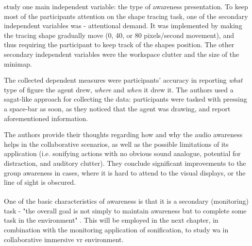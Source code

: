 \parencite{gutwin_chalk_2011} study one main independent variable: the type of awareness presentation. To keep most of the participants attention on the shape tracing task, one of the secondary independent variables was - attentional demand. It was implemented by making the tracing shape gradually move (0, 40, or 80 pixels/second movement), and thus requiring the participant to keep track of the shapes position. The other secondary independent variables were the workspace clutter and the size of the minimap.

The collected dependent measures were participants' accuracy in reporting \textit{what }type of figure the agent drew, \textit{where }and \textit{when }it drew it.
The authors used a \gls{sagat}-like approach for collecting the data: participants were tasked with pressing a space-bar as soon, as they noticed that the agent was drawing, and report aforementioned information.

The authors provide their thoughts regarding how and why the audio awareness helps in the collaborative scenarios, as well as the possible limitations of its application (i.e. sonifying actions with no obvious sound analogue, potential for distraction, and auditory clutter). They conclude significant improvements to the group awareness in cases, where it is hard to attend to the visual displays, or the line of sight is obscured.


\paragraph[Bridge to experiments]{}
One of the basic characteristics of awareness is that it is a secondary (monitoring) task - "the overall goal is not simply to maintain awareness but to complete some task in the environment" \parencite{gutwin_descriptive_2002}. This will be employed in the next chapter, in combination with the monitoring application of sonification, to study \gls{wa} in collaborative immersive \gls{vr} environment.